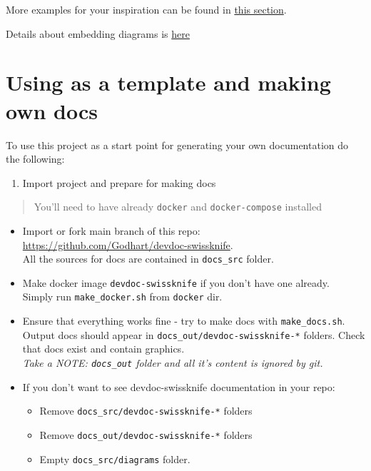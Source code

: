 \documentclass[
  12pt,
  a4paper,
  12pt,
  oneside,
  openany]{book}
\providecommand{\tightlist}{%
  \setlength{\itemsep}{0pt}\setlength{\parskip}{0pt}}
\begin{document}
More examples for your inspiration can be found in \protect\hyperlink{examples-kroki}{this section}.

Details about embedding diagrams is \protect\hyperlink{usage}{here}

\hypertarget{template}{%
\chapter{Using as a template and making own docs}\label{template}}

To use this project as a start point for generating your own documentation do the following:

\begin{enumerate}
\def\labelenumi{\arabic{enumi}.}
\tightlist
\item
  Import project and prepare for making docs
\end{enumerate}

\begin{quote}
You'll need to have already \texttt{docker} and \texttt{docker-compose} installed
\end{quote}

\begin{itemize}
\item
  Import or fork main branch of this repo: \url{https://github.com/Godhart/devdoc-swissknife}.\\
  All the sources for docs are contained in \texttt{docs\_src} folder.
\item
  Make docker image \texttt{devdoc-swissknife} if you don't have one already.\\
  Simply run \texttt{make\_docker.sh} from \texttt{docker} dir.
\item
  Ensure that everything works fine - try to make docs with \texttt{make\_docs.sh}.\\
  Output docs should appear in \texttt{docs\_out/devdoc-swissknife-*} folders. Check that docs exist and contain graphics.\\
  \emph{Take a NOTE: \texttt{docs\_out} folder and all it's content is ignored by git.}
\item
  If you don't want to see devdoc-swissknife documentation in your repo:

  \begin{itemize}
  \tightlist
  \item
    Remove \texttt{docs\_src/devdoc-swissknife-*} folders
  \item
    Remove \texttt{docs\_out/devdoc-swissknife-*} folders
  \item
    Empty \texttt{docs\_src/diagrams} folder.
  \end{itemize}
\end{itemize}
\end{document}
